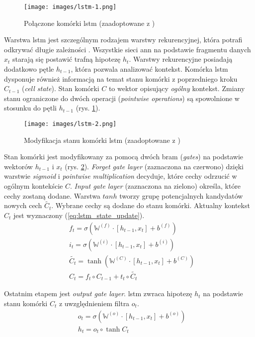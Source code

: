 \begin{figure}
    \centering
    \texttt{[image: images/lstm-1.png]}
    \caption{Połączone komórki \acrshort{lstm} (zaadoptowane z \cite{lstm:colah})}
    \label{fig:lstm-1}
\end{figure}

Warstwa \acrfull{lstm} jest szczególnym rodzajem warstwy rekurencyjnej, która potrafi odkrywać długie zależności \cite{lstm}. Wszystkie sieci \acrshort{ann} na podstawie fragmentu danych $x_t$ starają się postawić trafną hipotezę $h_t$. Warstwy rekurencyjne posiadają dodatkowo pętle $h_{t-1}$, która pozwala analizować kontekst. Komórka \acrshort{lstm} dysponuje również informacją na temat stanu komórki z poprzedniego kroku $C_{t-1}$ (\textit{cell state}). Stan komórki $C$ to wektor opisujący \emph{ogólny} kontekst. Zmiany stanu ograniczone do dwóch operacji (\textit{pointwise operations}) są spowolnione w stosunku do pętli $h_{t-1}$ (rys. \ref{fig:lstm-1}).

\begin{figure}
    \centering
    \texttt{[image: images/lstm-2.png]}
    \caption{Modyfikacja stanu komórki \acrshort{lstm} (zaadoptowane z \cite{lstm:colah})}
    \label{fig:lstm-2}
\end{figure}

Stan komórki jest modyfikowany za pomocą dwóch bram (\textit{gates}) na podstawie wektorów $h_{t-1}$ i $x_t$ (rys. \ref{fig:lstm-2}). \textit{Forget gate layer} (zaznaczona na czerwono) dzięki warstwie \textit{sigmoid} i \textit{pointwise multiplication} decyduje, które cechy odrzucić w ogólnym kontekście $C$. \textit{Input gate layer} (zaznaczona na zielono) określa, które cechy zostaną dodane. Warstwa $tanh$ tworzy grupę potencjalnych kandydatów nowych cech $\tilde{C_t}$. Wybrane cechy są dodane do stanu komórki. Aktualny kontekst $C_t$ jest wyznaczony (\ref{eq:lstm_state_update}). 
\begin{align}
&f_t = \sigma(\mathbb{W}^{(f)} \cdot [h_{t-1}, x_t] + b^{(f)}) \\
&i_t = \sigma(\mathbb{W}^{(i)} \cdot [h_{t-1}, x_t] + b^{(i)}) \\
&\tilde{C_t} = \tanh(\mathbb{W}^{(C)} \cdot [h_{t-1}, x_t] + b^{(C)}) \\
&C_t = f_t \circ C_{t-1} + t_t \circ \tilde{C_t} \label{eq:lstm_state_update}
\end{align}

Ostatnim etapem jest \textit{output gate layer}. \acrshort{lstm} zwraca hipotezę $h_t$ na podstawie stanu komórki $C_t$ z uwzględnieniem filtra $o_t$. 
\begin{align}
&o_t = \sigma(\mathbb{W}^{(o)} \cdot [h_{t-1}, x_t] + b^{(o)}) \\
&h_t = o_t \circ \tanh{C_t}
\end{align}

